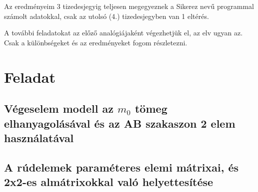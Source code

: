 \documentclass{article}
\newcommand{\rpm}{\raisebox{.2ex}{$\scriptstyle\pm$}}
\begin{document}
		Az eredményeim 3 tizedesjegyig teljesen megegyeznek a Sikerez nevű programmal számolt adatokkal, csak az utolsó (4.) tizedesjegyben van \rpm1 eltérés. 
		
				
		A további feladatokat az előző analógiájaként végezhetjük el, az elv ugyan az. 
		Csak a különbségeket és az eredményeket fogom részletezni.
	
	
	\section{Feladat}
		
	\subsection{Végeselem modell az $m_{0}$ tömeg elhanyagolásával és az \textbf{AB} szakaszon 2 elem használatával}
	
		\begin{figure}[h!]		
			\begin{center}	
			\end{center}	
		\caption{}
		\end{figure}
	
	
		\subsection{A rúdelemek paraméteres elemi mátrixai, és 2x2-es almátrixokkal való helyettesítése}
	
\end{document}

